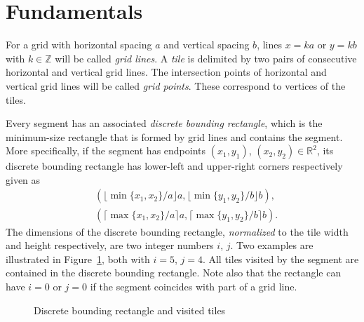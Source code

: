 \documentclass[12pt, a4paper]{article}
\begin{document}
\section{Fundamentals}
\label{part: fund results}

For a grid with horizontal spacing $a$ and vertical spacing $b$, lines $x = ka$ or $y = kb$ with $k \in \mathbb Z$ will be called \emph{grid lines}. A \emph{tile} is delimited by two pairs of consecutive horizontal and vertical grid lines. The intersection points of horizontal and vertical grid lines will be called \emph{grid points}. These correspond to vertices of the tiles.

Every segment has an associated \emph{discrete bounding rectangle}, which is the minimum-size rectangle that is formed by grid lines and contains the segment. More specifically, if the segment has endpoints $(x_1,y_1)$, $(x_2,y_2) \in \mathbb R^2$, its discrete bounding rectangle has lower-left and upper-right corners respectively given as
\begin{align*}
& (\lfloor\min\{x_1, x_2\}/a\rfloor a, \lfloor\min\{y_1,y_2\}/b\rfloor b), \\
& (\lceil\max\{x_1, x_2\}/a \rceil a, \lceil\max\{y_1,y_2\}/b \rceil b).
\end{align*}
The dimensions of the discrete bounding rectangle, \emph{normalized} to the tile width and height respectively, are two integer numbers $i$, $j$. Two examples are illustrated in Figure~\ref{fig: discrete bounding rectangle and touched tiles}, both with $i=5$, $j=4$. All tiles visited by the segment are contained in the discrete bounding rectangle. Note also that the rectangle can have $i=0$ or $j=0$ if the segment coincides with part of a grid line.

\begin{figure}
\centering%
\hfill%
%
\caption{Discrete bounding rectangle and visited tiles
}%
\label{fig: discrete bounding rectangle and touched tiles}%
\end{figure}%
\end{document}
